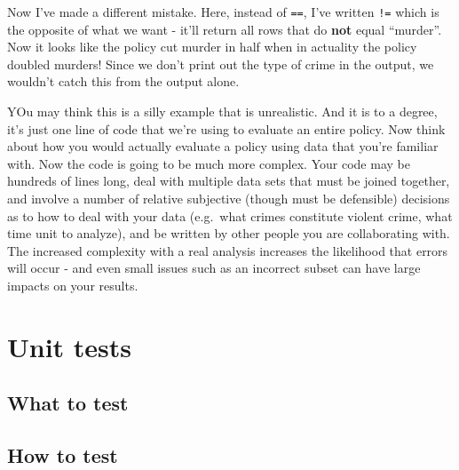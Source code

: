 \documentclass[
  12pt,
]{book}
\newenvironment{Shaded}{\begin{snugshade}}{\end{snugshade}}
\newcommand{\CommentTok}[1]{\textcolor[rgb]{0.37,0.37,0.37}{\textit{#1}}}
\newcommand{\KeywordTok}[1]{\textcolor[rgb]{0.27,0.27,0.27}{\textbf{#1}}}
\newcommand{\NormalTok}[1]{#1}
\newcommand{\OperatorTok}[1]{\textcolor[rgb]{0.43,0.43,0.43}{\textbf{#1}}}
\newcommand{\StringTok}[1]{\textcolor[rgb]{0.5,0.5,0.5}{#1}}
\begin{document}
Now I've made a different mistake. Here, instead of \texttt{==}, I've written \texttt{!=} which is the opposite of what we want - it'll return all rows that do \textbf{not} equal ``murder''. Now it looks like the policy cut murder in half when in actuality the policy doubled murders! Since we don't print out the type of crime in the output, we wouldn't catch this from the output alone.

\begin{Shaded}
\end{Shaded}

YOu may think this is a silly example that is unrealistic. And it is to a degree, it's just one line of code that we're using to evaluate an entire policy. Now think about how you would actually evaluate a policy using data that you're familiar with. Now the code is going to be much more complex. Your code may be hundreds of lines long, deal with multiple data sets that must be joined together, and involve a number of relative subjective (though must be defensible) decisions as to how to deal with your data (e.g.~what crimes constitute violent crime, what time unit to analyze), and be written by other people you are collaborating with. The increased complexity with a real analysis increases the likelihood that errors will occur - and even small issues such as an incorrect subset can have large impacts on your results.

\hypertarget{unit-tests}{%
\section{Unit tests}\label{unit-tests}}

\hypertarget{what-to-test}{%
\subsection{What to test}\label{what-to-test}}

\hypertarget{how-to-test}{%
\subsection{How to test}\label{how-to-test}}
\end{document}
